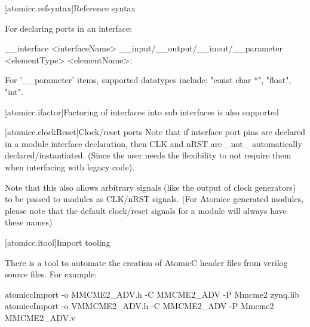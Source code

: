 [atomicc.refsyntax]{Reference syntax}

For declaring ports in an interface:
\begin{codeblock}
     __interface <interfaceName> {
          __input/__output/__inout/__parameter <elementType> <elementName>;
     }
\end{codeblock}
For '__parameter' items, supported datatypes include: "const char *", "float", "int".

[atomicc.ifactor]{Factoring of interfaces into sub interfaces is also supported}

[atomicc.clockReset]{Clock/reset ports}
Note that if interface port pins are declared in a module interface declaration, then
CLK and nRST are _not_ automatically declared/instantiated.  (Since the user needs the
flexibility to not require them when interfacing with legacy code).

Note that this also allows arbitrary signals (like the output of clock generators) to be
passed to modules as CLK/nRST signals.  (For Atomicc generated modules, please note that the
default clock/reset signals for a module will always have these names)

[atomicc.itool]{Import tooling}

There is a tool to automate the creation of AtomicC header files from verilog source files.
For example:
\begin{codeblock}
     atomiccImport -o MMCME2_ADV.h -C MMCME2_ADV -P Mmcme2 zynq.lib
     atomiccImport -o VMMCME2_ADV.h -C MMCME2_ADV -P Mmcme2 MMCME2_ADV.v
\end{codeblock}
